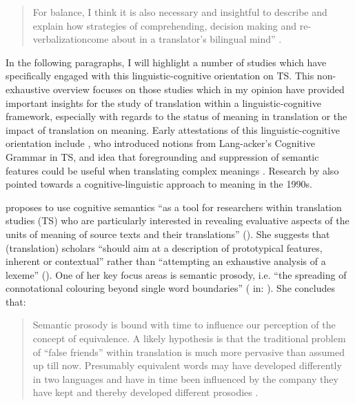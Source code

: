 \begin{quote}
For balance, I think it is also necessary and insightful to describe and explain how strategies of comprehending, decision making and re-verbalization\linebreak come about in a translator’s bilingual mind” \citep[46]{house_towards_2013}.
\end{quote}

In the following paragraphs, I will highlight a number of studies which have specifically engaged with this linguistic-cognitive orientation on TS. This non-exhaustive overview focuses on those studies which in my opinion have provided important insights for the study of translation within a linguistic-cognitive framework, especially with regards to the status of meaning in translation or the impact of translation on meaning. Early attestations of this linguistic-cognitive orientation include \citet{tabakowska_cognitive_1993}, who introduced notions from Lang-\linebreak acker’s Cognitive Grammar in TS, and  idea that foregrounding and suppression of semantic features could be useful when translating complex meanings \citep[8]{rojo_cognitive_2013}. Research by \citet{wilss_knowledge_1996} also pointed towards a cognitive-linguistic approach to meaning in the 1990s.

\citet{korning_zethsen_corpus-based_2008} proposes to use cognitive semantics “as a tool for researchers within translation studies (TS) who are particularly interested in revealing evaluative aspects of the units of meaning of source texts and their translations” (\citeyear[249]{korning_zethsen_corpus-based_2008}). She suggests that (translation) scholars “should aim at a description of prototypical features, inherent or contextual” rather than “attempting an exhaustive analysis of a lexeme” (\citeyear[251]{korning_zethsen_corpus-based_2008}). One of her key focus areas is semantic prosody, i.e. “the spreading of connotational colouring beyond single word boundaries” (\citealt[68]{partington_patterns_1998} in: \citealt[256]{korning_zethsen_corpus-based_2008}). She concludes that:

\begin{quote}
Semantic prosody is bound with time to influence our perception of the concept of equivalence. A likely hypothesis is that the traditional problem of ``false friends'' within translation is much more pervasive than assumed up till now. Presumably equivalent words may have developed differently in two languages and have in time been influenced by the company they have kept and thereby developed different prosodies \citep[258]{korning_zethsen_corpus-based_2008}.
\end{quote}

